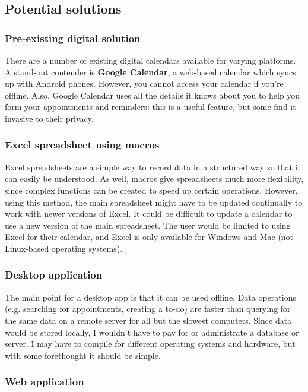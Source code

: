 \subsection{Potential solutions}
\subsubsection{Pre-existing digital solution}

There are a number of existing digital calendars available for varying
platforms. A stand-out contender is \textbf{Google Calendar}, a web-based
calendar which syncs up with Android phones. However, you cannot access your
calendar if you're offline. Also, Google Calendar uses all the details it knows
about you to help you form your appointments and reminders: this is a useful
feature, but some find it invasive to their privacy.


\subsubsection{Excel spreadsheet using macros}

Excel spreadsheets are a simple way to record data in a structured way so that
it can easily be understood. As well, macros give spreadsheets much more
flexibility, since complex functions can be created to speed up certain
operations. However, using this method, the main spreadsheet might have to be
updated continually to work with newer versions of Excel. It could be difficult
to update a calendar to use a new version of the main spreadsheet. The user
would be limited to using Excel for their calendar, and Excel is only available
for Windows and Mac (not Linux-based operating systems).


\subsubsection{Desktop application}

The main point for a desktop app is that it can be used offline. Data operations
(e.g. searching for appointments, creating a to-do) are faster than querying for
the same data on a remote server for all but the slowest computers. Since data
would be stored locally, I wouldn't have to pay for or administrate a database
or server. I may have to compile for different operating systems and hardware,
but with some forethought it should be simple.


\subsubsection{Web application}

